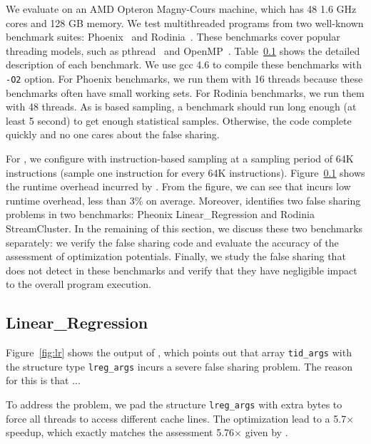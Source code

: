 \label{sec:eval}

We evaluate \cheetah{} on an AMD Opteron Magny-Cours machine, which has 48 1.6 GHz cores and 128 GB memory. We test multithreaded programs from two well-known benchmark suites: Phoenix~\cite{} and Rodinia~\cite{}. These benchmarks cover popular threading models, such as pthread~\cite{} and OpenMP~\cite{}. Table~\ref{} shows the detailed description of each benchmark. We use gcc 4.6 to compile these benchmarks with {\tt -O2} option. For Phoenix benchmarks, we run them with 16 threads because these benchmarks often have small working sets. For Rodinia benchmarks, we run them with 48 threads. As \cheetah is based sampling, a benchmark should run long enough (at least 5 second) to get enough statistical samples. Otherwise, the code complete quickly and no one cares about the false sharing. 

For \cheetah{}, we configure with instruction-based sampling at a sampling period of 64K instructions (sample one instruction for every 64K instructions). Figure~\ref{} shows the runtime overhead incurred by \cheetah{}. From the figure, we can see that \cheetah{} incurs low runtime overhead, less than 3\% on average. Moreover, \cheetah{} identifies two false sharing problems in two benchmarks: Pheonix Linear\_Regression and Rodinia StreamCluster. In the remaining of this section, we discuss these two benchmarks separately: we verify the false sharing code and evaluate the accuracy of the assessment of optimization potentials. Finally, we study the false sharing that \cheetah{} does not detect in these benchmarks and verify that they have negligible impact to the overall program execution. 

\subsection{Linear\_Regression}
Figure~\ref{fig:lr} shows the output of \cheetah{}, which points out that array {\tt tid\_args} with the structure type {\tt lreg\_args} incurs a severe false sharing problem. The reason for this is that ...

To address the problem, we pad the structure {\tt lreg\_args} with extra bytes to force all threads to access different cache lines. The optimization lead to a 5.7$\times$ speedup, which exactly matches the assessment 5.76$\times$ given by \cheetah{}.

